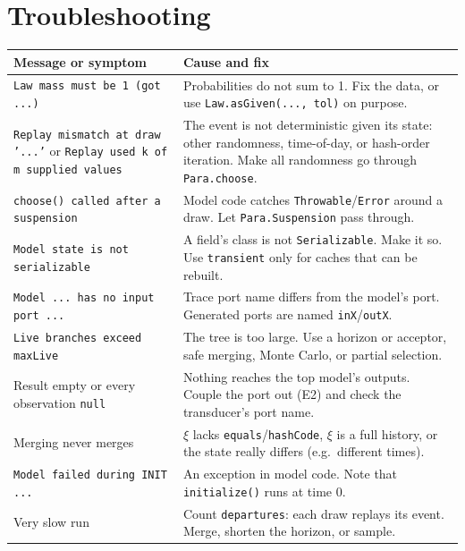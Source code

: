 \documentclass[11pt]{article}
\newcommand{\code}[1]{\texttt{#1}}
\begin{document}
\section{Troubleshooting}
\begin{center}
\small
\begin{tabularx}{\linewidth}{@{}>{\raggedright\arraybackslash}p{4.6cm} >{\raggedright\arraybackslash}X@{}}
\toprule
\textbf{Message or symptom} & \textbf{Cause and fix}\\
\midrule
\code{Law mass must be 1 (got ...)} & Probabilities do not sum to 1. Fix the data, or use \code{Law.asGiven(..., tol)} on purpose.\\
\code{Replay mismatch at draw '...'} or \code{Replay used k of m supplied values} & The event is not deterministic given its state: other randomness, time-of-day, or hash-order iteration. Make all randomness go through \code{Para.choose}.\\
\code{choose() called after a suspension} & Model code catches \code{Throwable}/\code{Error} around a draw. Let \code{Para.Suspension} pass through.\\
\code{Model state is not serializable} & A field's class is not \code{Serializable}. Make it so. Use \code{transient} only for caches that can be rebuilt.\\
\code{Model ... has no input port ...} & Trace port name differs from the model's port. Generated ports are named \code{inX}/\code{outX}.\\
\code{Live branches exceed maxLive} & The tree is too large. Use a horizon or acceptor, safe merging, Monte Carlo, or partial selection.\\
Result empty or every observation \code{null} & Nothing reaches the top model's outputs. Couple the port out (E2) and check the transducer's port name.\\
Merging never merges & $\xi$ lacks \code{equals}/\code{hashCode}, $\xi$ is a full history, or the state really differs (e.g.\ different times).\\
\code{Model failed during INIT ...} & An exception in model code. Note that \code{initialize()} runs at time 0.\\
Very slow run & Count \code{departures}: each draw replays its event. Merge, shorten the horizon, or sample.\\
\bottomrule
\end{tabularx}
\end{center}
\end{document}
